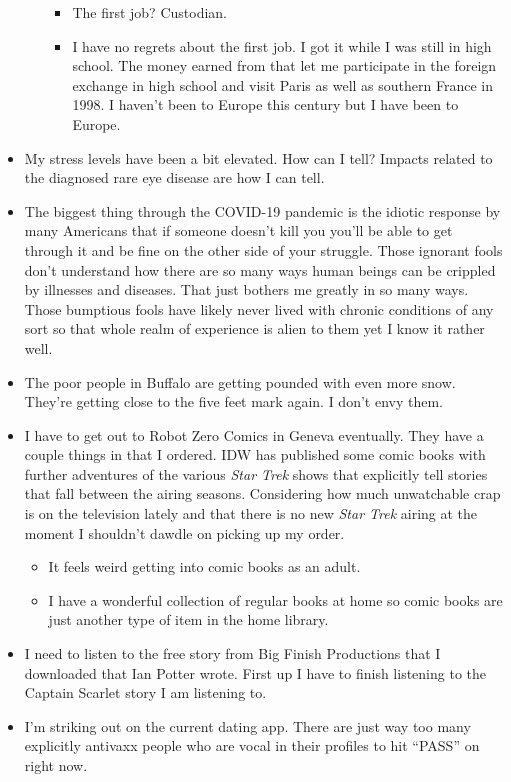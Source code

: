 \begin{itemize}
\begin{itemize}
    \begin{itemize}
    \tightlist
    \item
      The first job? Custodian.
    \item
      I have no regrets about the first job. I got it while I was still
      in high school. The money earned from that let me participate in
      the foreign exchange in high school and visit Paris as well as
      southern France in 1998. I haven't been to Europe this century but
      I have been to Europe.
    \end{itemize}
  \end{itemize}
\item
  My stress levels have been a bit elevated. How can I tell? Impacts
  related to the diagnosed rare eye disease are how I can tell.
\item
  The biggest thing through the COVID-19 pandemic is the idiotic
  response by many Americans that if someone doesn't kill you you'll be
  able to get through it and be fine on the other side of your struggle.
  Those ignorant fools don't understand how there are so many ways human
  beings can be crippled by illnesses and diseases. That just bothers me
  greatly in so many ways. Those bumptious fools have likely never lived
  with chronic conditions of any sort so that whole realm of experience
  is alien to them yet I know it rather well.
\item
  The poor people in Buffalo are getting pounded with even more snow.
  They're getting close to the five feet mark again. I don't envy
  them.\\
\item
  I have to get out to Robot Zero Comics in Geneva eventually. They have
  a couple things in that I ordered. IDW has published some comic books
  with further adventures of the various \emph{Star Trek} shows that
  explicitly tell stories that fall between the airing seasons.
  Considering how much unwatchable crap is on the television lately and
  that there is no new \emph{Star Trek} airing at the moment I shouldn't
  dawdle on picking up my order.

  \begin{itemize}
  \tightlist
  \item
    It feels weird getting into comic books as an adult.
  \item
    I have a wonderful collection of regular books at home so comic
    books are just another type of item in the home library.
  \end{itemize}
\item
  I need to listen to the free story from Big Finish Productions that I
  downloaded that Ian Potter wrote. First up I have to finish listening
  to the Captain Scarlet story I am listening to.
\item
  I'm striking out on the current dating app. There are just way too
  many explicitly antivaxx people who are vocal in their profiles to hit
  ``PASS'' on right now.
\end{itemize}
